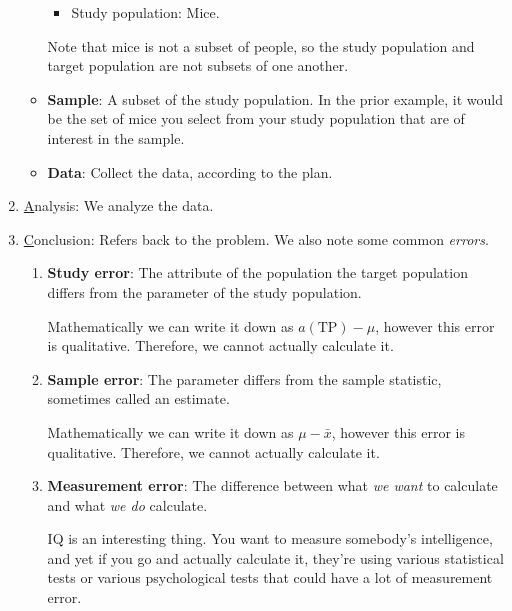 \begin{enumerate}
\begin{itemize}
\begin{Example}{}{}
\begin{itemize}
                            \item Study population: Mice.
                        \end{itemize}
                        Note that mice is not a subset of people,
                        so the study population and target population are not subsets of one
                        another.
                    \end{Example}
              \item \textbf{Sample}: A subset of the study population.
                    In the prior example, it would be the set of mice you
                    select from your study population that are of interest
                    in the sample.
              \item \textbf{Data}: Collect the data, according to the plan.
          \end{itemize}
    \item \underline{A}nalysis: We analyze the data.
    \item \underline{C}onclusion: Refers back to the problem. We also
          note some common \emph{errors}.
          \begin{enumerate}
              \item \textbf{Study error}: The attribute of the population the
                    target population differs from the parameter of the study population.
                    \begin{Example}{}{}
                        Mathematically we can write it down as $ a(\text{TP})-\mu $,
                        however this error is qualitative. Therefore, we cannot
                        actually calculate it.
                    \end{Example}
              \item \textbf{Sample error}: The parameter differs from the
                    sample statistic, sometimes called an estimate.
                    \begin{Example}{}{}
                        Mathematically we can write it down as $ \mu-\bar{x} $,
                        however this error is qualitative. Therefore, we cannot
                        actually calculate it.
                    \end{Example}
              \item \textbf{Measurement error}: The difference
                    between what \emph{we want} to calculate and what \emph{we do}
                    calculate.
                    \begin{Example}{}{}
                        IQ is an interesting thing. You want to measure somebody's intelligence,
                        and yet if you go and actually calculate it, they're using various
                        statistical tests or various psychological tests
                        that could have a lot of measurement error.
                    \end{Example}
          \end{enumerate}
\end{enumerate}


